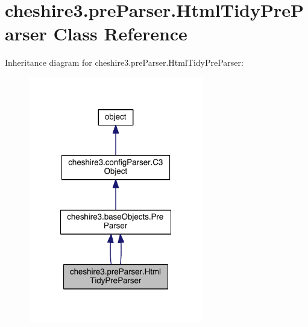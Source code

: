 \hypertarget{classcheshire3_1_1pre_parser_1_1_html_tidy_pre_parser}{\section{cheshire3.\-pre\-Parser.\-Html\-Tidy\-Pre\-Parser Class Reference}
\label{classcheshire3_1_1pre_parser_1_1_html_tidy_pre_parser}
}


Inheritance diagram for cheshire3.\-pre\-Parser.\-Html\-Tidy\-Pre\-Parser\-:
\nopagebreak
\begin{figure}[H]
\begin{center}
\leavevmode
\includegraphics[width=216pt]{classcheshire3_1_1pre_parser_1_1_html_tidy_pre_parser__inherit__graph}
\end{center}
\end{figure}


